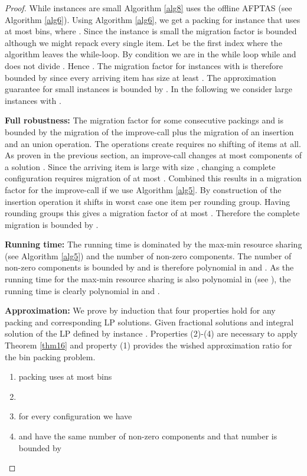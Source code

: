 \documentclass[a4paper,11pt]{article}
\begin{document}
\begin{proof}
	While instances are small Algorithm \ref{alg8} uses the offline AFPTAS (see Algorithm \ref{alg6}). Using Algorithm \ref{alg6}, we get a packing
	 for instance  that uses at most
	 bins, where 
	. 
	Since the instance is small
	the migration factor is bounded although we might repack every single item. Let  be the first index where
	the algorithm leaves the while-loop. By condition we are in the while loop
	while  and  does not divide . Hence . The migration factor for instances  with 
	 is therefore bounded by  since every arriving item
	has size at least . The approximation guarantee for small instances is bounded by 
	.
	In the following we consider large instances  with .
	
	{\bf Full robustness:} The migration factor for some consecutive packings  and  is bounded by
	the migration of the improve-call plus the migration of an insertion and an union operation. 
	The operations create requires no shifting of items at all.
	As proven in the previous section, an improve-call changes at most  components of a solution .
	Since the arriving item is large with size , changing a complete configuration 
	requires migration of at most .
	Combined this results in a migration factor for the improve-call  
	if we use Algorithm \ref{alg5}.
	By construction of the insertion operation it shifts in worst case one item per 
	rounding group. Having  rounding groups this gives a migration factor of at most 
	.
	Therefore the complete migration is bounded by .
	
	{\bf Running time:} The running time is dominated by the max-min resource sharing (see Algorithm \ref{alg5}) and 
	the number of non-zero components. The number of non-zero components is bounded by 
	and is therefore polynomial in  and . As the running time for the max-min resource sharing
	is also polynomial in  (see \cite{grigoriadis2001approximate}), 
	the running time is clearly polynomial in  and .
	
	{\bf Approximation:} We prove by induction that four properties hold for any packing 
	and corresponding LP solutions. Given fractional solutions
	 and integral solution  of the LP defined by instance . 
	Properties (2)-(4) are
	necessary to apply Theorem \ref{thm16} and property (1) provides the wished approximation ratio for the bin packing problem.
	\begin{enumerate}
		\item packing  uses at most  bins
		\item 
		\item for every configuration  we have 
		\item  and  have the same number of non-zero components and that number is bounded by 
		

\end{enumerate}
\end{proof}
\end{document}
